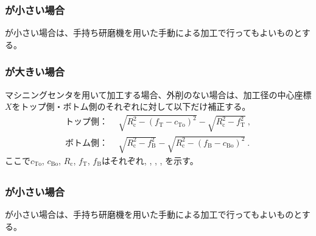 \subsubsection{\EndFaceCChamferLength が小さい場合}
\EndFaceOutCChamferLength が小さい場合は、手持ち研磨機を用いた手動による加工で行ってもよいものとする。

\subsubsection{\EndFaceCChamferLength が大きい場合}
マシニングセンタを用いて加工する場合、外削のない場合は、加工径の中心座標$X$をトップ側・ボトム側のそれぞれに対して以下だけ補正する。
\begin{align*}
  \text{トップ側：}&~~
  \sqrt{R_\mathrm c^2-\left(f_\mathrm T-c_\mathrm{To}\right)^2}-\sqrt{R_\mathrm c^2-f_\mathrm T^2}\ ,\\
  \text{ボトム側：}&~~
  \sqrt{R_\mathrm c^2-f_\mathrm B^2}-\sqrt{R_\mathrm c^2-\left(f_\mathrm B-c_\mathrm{Bo}\right)^2}\ .
\end{align*}
ここで$c_\mathrm{To}$, $c_\mathrm{Bo}$, $R_\mathrm c$, $f_\mathrm T$, $f_\mathrm B$はそれぞれ\TopEndFaceOutCChamferLength, \BottomEndFaceOutCChamferLength, \CenterCurvatureRadius, \TopAlocationLength, \BottomAlocationLength を示す。


\clearpage
\subsection{\EndFaceInCChamferMilling}

\subsubsection{\EndFaceInCChamferLength が小さい場合}
\EndFaceInCChamferLength が小さい場合は、手持ち研磨機を用いた手動による加工で行ってもよいものとする。

